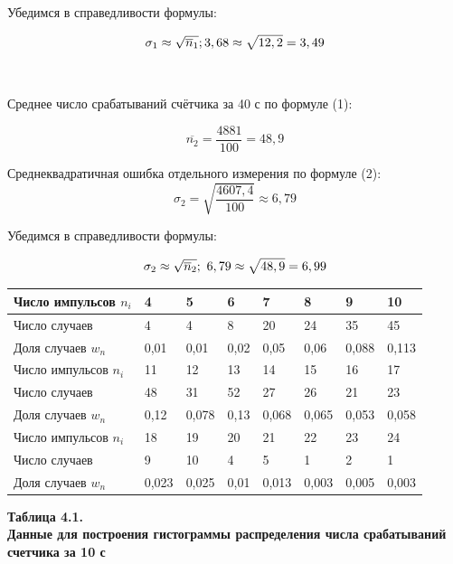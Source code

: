 Убедимся в справедливости формулы:


\[\sigma_1 \approx \sqrt{\overline{n}_1};\\  3,68 \approx \sqrt{12,2} = 3,49\]\\\\




Среднее число срабатываний счётчика за 40 с по формуле (1):


\[\overline{n_2} = \frac{4881}{100} = 48,9\]


Среднеквадратичная ошибка отдельного измерения по формуле (2):
\[\sigma_2 = \sqrt{\frac{4607,4}{100}} \approx 6,79\]


Убедимся в справедливости формулы:


\[\sigma_2 \approx \sqrt{\overline{n}_2};\\\  6,79 \approx \sqrt{48,9} = 6,99\]








\begin{table}[H]
\centering
\begin{tabular}{|l|l|l|l|l|l|l|l|}
\hline
Число импульсов $n_i$ & 4     & 5     & 6    & 7     & 8     & 9     & 10    \\ \hline
Число случаев        & 4     & 4     & 8    & 20    & 24    & 35    & 45    \\ \hline
Доля случаев $w_n$    & 0,01  & 0,01  & 0,02 & 0,05  & 0,06  & 0,088 & 0,113 \\ \hline\hline
Число импульсов $n_i$ & 11    & 12    & 13   & 14    & 15    & 16    & 17    \\ \hline
Число случаев        & 48    & 31    & 52   & 27    & 26    & 21    & 23    \\ \hline
Доля случаев $w_n$    & 0,12  & 0,078 & 0,13 & 0,068 & 0,065 & 0,053 & 0,058 \\ \hline\hline
Число импульсов $n_i$ & 18    & 19    & 20   & 21    & 22    & 23    & 24    \\ \hline
Число случаев        & 9     & 10    & 4    & 5     & 1     & 2     & 1     \\ \hline
Доля случаев $w_n$    & 0,023 & 0,025 & 0,01 & 0,013 & 0,003 & 0,005 & 0,003 \\ \hline
\end{tabular}
\begin{flushright}
{\scriptsize \textbf{Таблица 4.1.}\\ \textbf {Данные для построения гистограммы распределения числа срабатываний счетчика за 10 с}}
\end{flushright}
\end{table}


